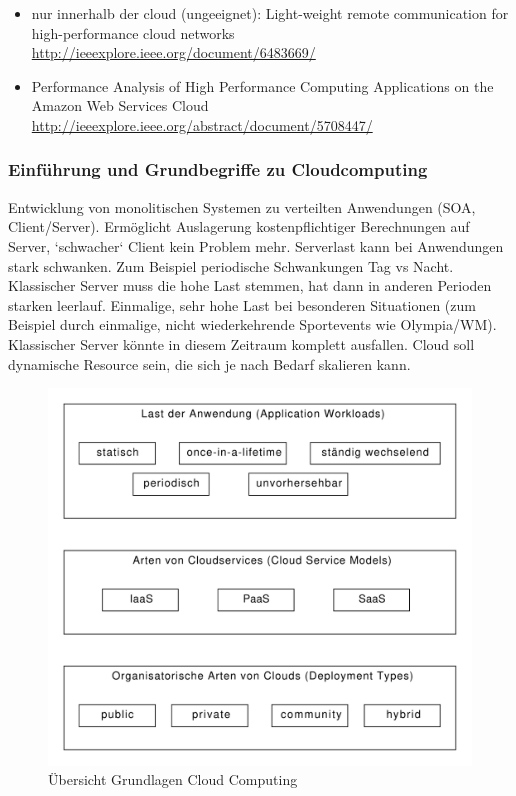 \documentclass[a4paper,10pt]{article}
\numberwithin{figure}{section}
\numberwithin{table}{section}
\begin{document}
\begin{itemize}
 \item nur innerhalb der cloud (ungeeignet): Light-weight remote communication for high-performance cloud networks \url{http://ieeexplore.ieee.org/document/6483669/}
 \item Performance Analysis of High Performance Computing Applications on the Amazon Web Services Cloud \url{http://ieeexplore.ieee.org/abstract/document/5708447/}
\end{itemize}

\subsubsection{Einführung und Grundbegriffe zu Cloudcomputing}

Entwicklung von monolitischen Systemen zu verteilten Anwendungen (SOA, Client/Server).
Ermöglicht Auslagerung kostenpflichtiger Berechnungen auf Server, `schwacher` Client kein Problem mehr.
Serverlast kann bei Anwendungen stark schwanken.
Zum Beispiel periodische Schwankungen Tag vs Nacht.
Klassischer Server muss die hohe Last stemmen, hat dann in anderen Perioden starken leerlauf.
Einmalige, sehr hohe Last bei besonderen Situationen (zum Beispiel durch einmalige, nicht wiederkehrende Sportevents wie Olympia/WM).
Klassischer Server könnte in diesem Zeitraum komplett ausfallen.
Cloud soll dynamische Resource sein, die sich je nach Bedarf skalieren kann.

\begin{figure}[htbp]
\centering
\caption{Übersicht Grundlagen Cloud Computing}
\label{fig:cloudComputingOverview}
\includegraphics[width=\textwidth]{graphics/cloudComputingOverview.pdf}
\end{figure}
\end{document}
